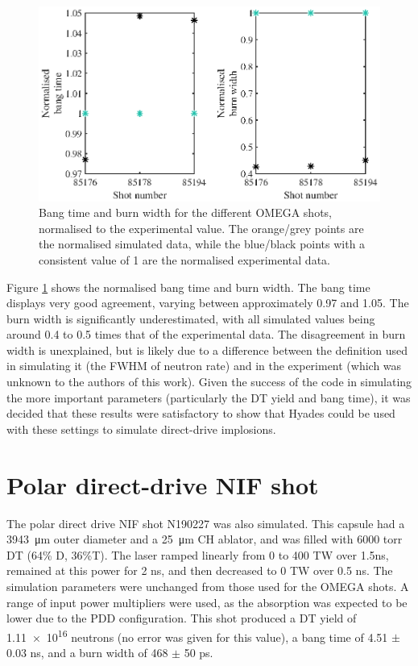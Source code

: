 \begin{figure}[ht]
\centering
\includegraphics{figures/LowCR/BenchmarkOmegaBT.eps}
\caption{Bang time and burn width for the different OMEGA shots, normalised to the experimental value. The orange/grey points are the normalised simulated data, while the blue/black points with a consistent value of 1 are the normalised experimental data.}
\label{fig:OmegaBT}
\end{figure}


Figure \ref{fig:OmegaBT} shows the normalised bang time and burn width. The bang time displays very good agreement, varying between approximately 0.97 and 1.05. The burn width is significantly underestimated, with all simulated values being around 0.4 to 0.5 times that of the experimental data. The disagreement in burn width is unexplained, but is likely due to a difference between the definition used in simulating it (the FWHM of neutron rate) and in the experiment (which was unknown to the authors of this work). Given the success of the code in simulating the more important parameters (particularly the DT yield and bang time), it was decided that these results were satisfactory to show that Hyades could be used with these settings to simulate direct-drive implosions.

\section{Polar direct-drive NIF shot}

The polar direct drive NIF shot N190227 \cite{NIFshot} was also simulated. This capsule had a 3943~\si[per-mode=symbol]{\micro\meter} outer diameter and a 25~\si[per-mode=symbol]{\micro\meter} CH ablator, and was filled with 6000 torr DT (64\% D, 36\%T). The laser ramped linearly from 0 to 400 TW over 1.5ns, remained at this power for 2 ns, and then decreased to 0 TW over 0.5 ns. The simulation parameters were unchanged from those used for the OMEGA shots. A range of input power multipliers were used, as the absorption was expected to be lower due to the PDD configuration. This shot produced a DT yield of \num{1.11e16} neutrons (no error was given for this value), a bang time of 4.51 $\pm$ 0.03 ns, and a burn width of 468 $\pm$ 50 ps. 

